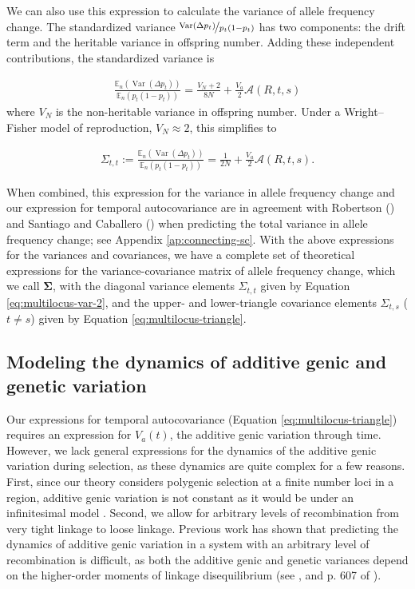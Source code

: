 \documentclass[11pt]{article}
\newcommand{\E}{\mathbb{E}}
\DeclareMathOperator{\var}{Var}
\begin{document}
We can also use this expression to calculate the variance of allele frequency
change. The standardized variance $\nicefrac{\var(\Delta p_t)}{p_t(1-p_t)}$ has
two components: the drift term and the heritable variance in offspring number.
Adding these independent contributions, the standardized variance is

\begin{align}
  \frac{\E_n(\var(\Delta p_t))}{\E_n(p_t(1-p_t))} = \frac{V_N + 2}{8N} + \frac{V_a}{2} \mathcal{A}(R, t, s)
  \label{eq:multilocus-var}
\end{align}
%
where $V_N$ is the non-heritable variance in offspring number. Under a
Wright--Fisher model of reproduction, $V_N \approx 2$, this simplifies to

\begin{align}
  \Sigma_{t,t} := \frac{\E_n(\var(\Delta p_t))}{\E_n(p_t(1-p_t))} = \frac{1}{2N}  + \frac{V_a}{2} \mathcal{A}(R, t, s).
  \label{eq:multilocus-var-2}
\end{align}

When combined, this expression for the variance in allele frequency change and
our expression for temporal autocovariance are in agreement with Robertson
(\citeyear{Robertson1961-ho}) and Santiago and Caballero
(\citeyear{Santiago1995-hx, Santiago1998-bs}) when predicting the total
variance in allele frequency change; see Appendix \ref{ap:connecting-sc}.
With the above expressions for the variances and covariances, we have a
  complete set of theoretical expressions for the variance-covariance matrix of
  allele frequency change, which we call $\mathbf{\Sigma}$, with the diagonal
  variance elements $\Sigma_{t,t}$ given by Equation \eqref{eq:multilocus-var-2},
  and the upper- and lower-triangle covariance elements $\Sigma_{t,s}$ ($t \ne
  s$) given by Equation \eqref{eq:multilocus-triangle}.

\subsection{Modeling the dynamics of additive genic and genetic variation}
\label{sec:dyn-var}

Our expressions for temporal autocovariance (Equation
\ref{eq:multilocus-triangle}) requires an expression for $V_a(t)$, the additive
genic variation through time.  However, we lack general expressions for the
dynamics of the additive genic variation during selection, as these dynamics
are quite complex for a few reasons. First, since our theory considers
polygenic selection at a finite number loci in a region, additive genic
variation is not constant as it would be under an infinitesimal model
\parencite{Bulmer1980-zo}. Second, we allow for arbitrary levels of
recombination from very tight linkage to loose linkage.  Previous work has
shown that predicting the dynamics of additive genic variation in a system with
an arbitrary level of recombination is difficult, as both the additive genic
and genetic variances depend on the higher-order moments of linkage
disequilibrium (see \cite{Barton1987-gl}, and p. 607 of \cite{Turelli1990-kd}). 
\end{document}
